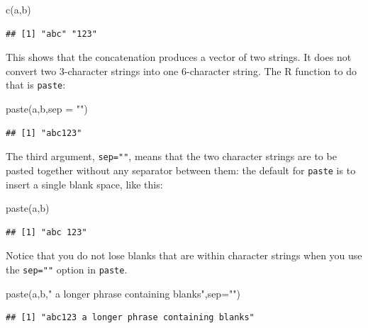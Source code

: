 \documentclass[
]{book}
\newenvironment{Shaded}{\begin{snugshade}}{\end{snugshade}}
\newcommand{\AttributeTok}[1]{\textcolor[rgb]{0.77,0.63,0.00}{#1}}
\newcommand{\FunctionTok}[1]{\textcolor[rgb]{0.00,0.00,0.00}{#1}}
\newcommand{\NormalTok}[1]{#1}
\newcommand{\StringTok}[1]{\textcolor[rgb]{0.31,0.60,0.02}{#1}}
\begin{document}
\begin{Shaded}
\begin{Highlighting}[]
\FunctionTok{c}\NormalTok{(a,b)}
\end{Highlighting}
\end{Shaded}

\begin{verbatim}
## [1] "abc" "123"
\end{verbatim}

This shows that the concatenation produces a vector of two strings. It does not convert two 3-character strings into one 6-character string. The R function to do that is \texttt{paste}:

\begin{Shaded}
\begin{Highlighting}[]
\FunctionTok{paste}\NormalTok{(a,b,}\AttributeTok{sep =} \StringTok{""}\NormalTok{)}
\end{Highlighting}
\end{Shaded}

\begin{verbatim}
## [1] "abc123"
\end{verbatim}

The third argument, \texttt{sep=""}, means that the two character strings are to be pasted together without any separator between them: the default for \texttt{paste} is to insert a single blank space, like this:

\begin{Shaded}
\begin{Highlighting}[]
\FunctionTok{paste}\NormalTok{(a,b)}
\end{Highlighting}
\end{Shaded}

\begin{verbatim}
## [1] "abc 123"
\end{verbatim}

Notice that you do not lose blanks that are within character strings when you use the \texttt{sep=""} option in
\texttt{paste}.

\begin{Shaded}
\begin{Highlighting}[]
\FunctionTok{paste}\NormalTok{(a,b,}\StringTok{" a longer phrase containing blanks"}\NormalTok{,}\AttributeTok{sep=}\StringTok{""}\NormalTok{)}
\end{Highlighting}
\end{Shaded}

\begin{verbatim}
## [1] "abc123 a longer phrase containing blanks"
\end{verbatim}
\end{document}
